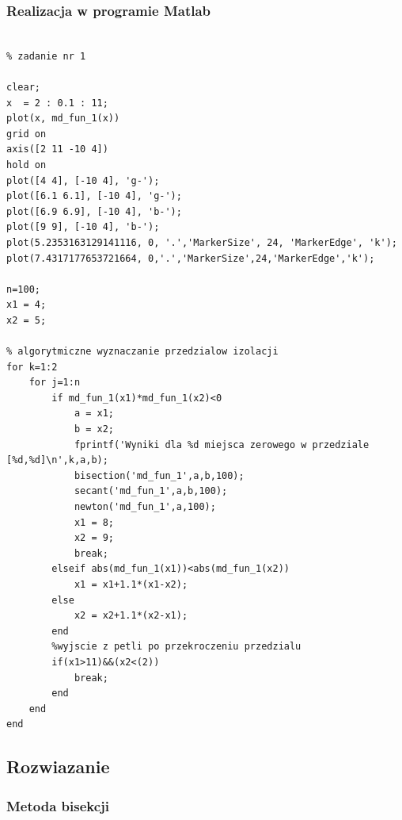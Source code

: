\documentclass[polish, 11pt, oneside]{article}   	%
\begin{document}
\subsubsection{Realizacja w programie Matlab}
\begin{lstlisting}[caption=Skrypt rozwiazujacy zadanie nr 1]

% zadanie nr 1

clear; 
x  = 2 : 0.1 : 11;
plot(x, md_fun_1(x))
grid on
axis([2 11 -10 4])
hold on
plot([4 4], [-10 4], 'g-');
plot([6.1 6.1], [-10 4], 'g-');
plot([6.9 6.9], [-10 4], 'b-');
plot([9 9], [-10 4], 'b-');
plot(5.2353163129141116, 0, '.','MarkerSize', 24, 'MarkerEdge', 'k');
plot(7.4317177653721664, 0,'.','MarkerSize',24,'MarkerEdge','k');

n=100; 
x1 = 4; 
x2 = 5; 

% algorytmiczne wyznaczanie przedzialow izolacji
for k=1:2
    for j=1:n
        if md_fun_1(x1)*md_fun_1(x2)<0
            a = x1;
            b = x2;
            fprintf('Wyniki dla %d miejsca zerowego w przedziale [%d,%d]\n',k,a,b);
            bisection('md_fun_1',a,b,100);
            secant('md_fun_1',a,b,100);
            newton('md_fun_1',a,100);
            x1 = 8; 
            x2 = 9; 
            break;
        elseif abs(md_fun_1(x1))<abs(md_fun_1(x2))
            x1 = x1+1.1*(x1-x2);
        else
            x2 = x2+1.1*(x2-x1);
        end
        %wyjscie z petli po przekroczeniu przedzialu
        if(x1>11)&&(x2<(2))
            break; 
        end
    end
end

\end{lstlisting}



\subsection{Rozwiazanie}
\subsubsection{Metoda bisekcji}
\end{document}
